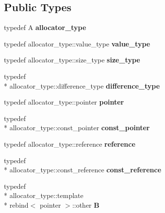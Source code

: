 \subsection*{Public Types}
\begin{DoxyCompactItemize}
\item 
\hypertarget{classmy__deque_a34236f0fef930decd11dc683f40a38be}{typedef A {\bfseries allocator\-\_\-type}}\label{classmy__deque_a34236f0fef930decd11dc683f40a38be}

\item 
\hypertarget{classmy__deque_ae9c156c405acc57623a4601ce755596f}{typedef allocator\-\_\-type\-::value\-\_\-type {\bfseries value\-\_\-type}}\label{classmy__deque_ae9c156c405acc57623a4601ce755596f}

\item 
\hypertarget{classmy__deque_a61e5e5317fe72a381ce4d45f09544b02}{typedef allocator\-\_\-type\-::size\-\_\-type {\bfseries size\-\_\-type}}\label{classmy__deque_a61e5e5317fe72a381ce4d45f09544b02}

\item 
\hypertarget{classmy__deque_ac85676cb2492fbc9bbc6f1a30e9d3c73}{typedef \\*
allocator\-\_\-type\-::difference\-\_\-type {\bfseries difference\-\_\-type}}\label{classmy__deque_ac85676cb2492fbc9bbc6f1a30e9d3c73}

\item 
\hypertarget{classmy__deque_a58e82fc365a3b086367479515e1515be}{typedef allocator\-\_\-type\-::pointer {\bfseries pointer}}\label{classmy__deque_a58e82fc365a3b086367479515e1515be}

\item 
\hypertarget{classmy__deque_a8fea5edeb2b2cf3dd1246dc3abf9b71b}{typedef \\*
allocator\-\_\-type\-::const\-\_\-pointer {\bfseries const\-\_\-pointer}}\label{classmy__deque_a8fea5edeb2b2cf3dd1246dc3abf9b71b}

\item 
\hypertarget{classmy__deque_a4c34c14f397b7676445b37c87003116b}{typedef allocator\-\_\-type\-::reference {\bfseries reference}}\label{classmy__deque_a4c34c14f397b7676445b37c87003116b}

\item 
\hypertarget{classmy__deque_ad50d8b378580088cf77fa43f0640e49c}{typedef \\*
allocator\-\_\-type\-::const\-\_\-reference {\bfseries const\-\_\-reference}}\label{classmy__deque_ad50d8b378580088cf77fa43f0640e49c}

\item 
\hypertarget{classmy__deque_ab048618779b53f527476ea8849c9b758}{typedef \\*
allocator\-\_\-type\-::template \\*
rebind$<$ pointer $>$\-::other {\bfseries B}}\label{classmy__deque_ab048618779b53f527476ea8849c9b758}

\end{DoxyCompactItemize}
